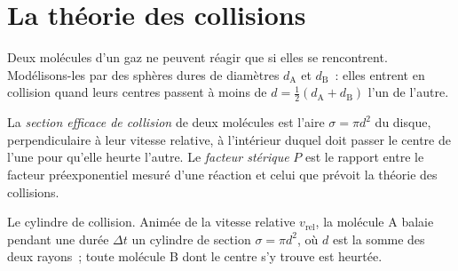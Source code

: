 \section{La théorie des collisions}

Deux molécules d'un gaz ne peuvent réagir que si elles se rencontrent.
Modélisons-les par des sphères dures de diamètres $d_{\mathrm A}$ et
$d_{\mathrm B}$~: elles entrent en collision quand leurs centres passent
à moins de $d =
\frac12(d_{\mathrm A} + d_{\mathrm B})$ l'un de l'autre.

\begin{definition}\label{def:b3:rate-theories:collision}
La \emph{section efficace de collision} de deux molécules
est l'aire $\sigma = \pi d^2$ du disque, perpendiculaire à leur vitesse
relative, à l'intérieur duquel doit passer le centre de l'une pour
qu'elle heurte l'autre. Le
\emph{facteur stérique} $P$ est
le rapport entre le facteur préexponentiel mesuré d'une réaction et celui
que prévoit la théorie des collisions.
\end{definition}

\begin{omfigure}

{\small Le cylindre de collision. Animée de la vitesse relative
$v_{\mathrm{rel}}$, la molécule A balaie
pendant une durée $\Delta t$ un cylindre de section $\sigma = \pi d^2$,
où $d$ est la somme des deux rayons~; toute molécule B dont le centre
s'y trouve est heurtée.}
\end{omfigure}

